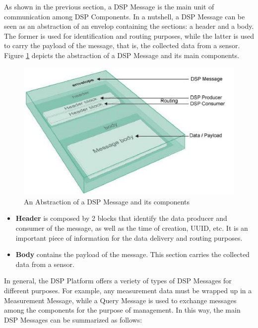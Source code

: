 As shown in the previous section, a DSP Message is the main unit of
communication among DSP Components. In a nutshell, a DSP Message can be seen
as an abstraction of an envelop containing the sections: a header and a body.
The former is used for identification and routing purposes, while the latter is
used to carry the payload of the message, that is, the collected data from
a sensor. Figure \ref{fig:DSP-Message-Representation} depicts the abstraction
of a DSP Message and its main components.

\begin{figure}[!b]
  \centering
  \includegraphics[scale=0.8]{../diagrams/DSP-Message-Representation}
  \caption{An Abstraction of a DSP Message and its components}
  \label{fig:DSP-Message-Representation}
\end{figure}

\begin{itemize}
  \item \textbf{Header} is composed by 2 blocks that identify the data
  producer and consumer of the message, as well as the time of creation, UUID,
  etc. It is an important piece of information for the data delivery and
  routing purposes.
  \item \textbf{Body} contains the payload of the message. This section carries
  the collected data from a sensor.
\end{itemize}

In general, the DSP Platform offers a veriety of types of DSP Messages for
different purposes. For example, any measurement data must be
wrapped up in a Measurement Message, while a Query Message is used to exchange
messages among the components for the purpose of management. In this way, the
main DSP Messages can be summarized as follows:

